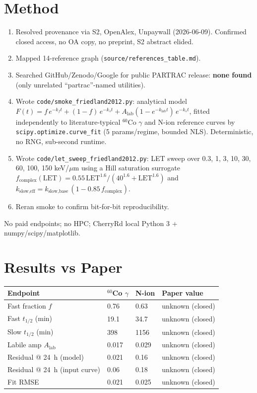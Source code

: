 \documentclass[11pt]{article}
\begin{document}
\section{Method}
\begin{enumerate}
\item Resolved provenance via S2, OpenAlex, Unpaywall (2026-06-09). Confirmed closed access, no OA copy, no preprint, S2 abstract elided.
\item Mapped 14-reference graph (\texttt{source/references\_table.md}).
\item Searched GitHub/Zenodo/Google for public PARTRAC release: \textbf{none found} (only unrelated ``partrac''-named utilities).
\item Wrote \texttt{code/smoke\_friedland2012.py}: analytical model
  $F(t) = f\,e^{-k_f t} + (1{-}f)\,e^{-k_s t} + A_{\text{lab}}(1-e^{-k_{\text{lab}}t})\,e^{-k_s t}$,
  fitted independently to literature-typical $^{60}$Co $\gamma$ and N-ion reference curves by \texttt{scipy.optimize.curve\_fit} (5 params/regime, bounded NLS). Deterministic, no RNG, sub-second runtime.
\item Wrote \texttt{code/let\_sweep\_friedland2012.py}: LET sweep over 0.3, 1, 3, 10, 30, 60, 100, 150 keV/$\mu$m using a Hill saturation surrogate $f_{\text{complex}}(\text{LET}) = 0.55\,\text{LET}^{1.6}/(40^{1.6}+\text{LET}^{1.6})$ and $k_{\text{slow,eff}} = k_{\text{slow,base}}\,(1 - 0.85\,f_{\text{complex}})$.
\item Reran smoke to confirm bit-for-bit reproducibility.
\end{enumerate}

No paid endpoints; no HPC; CherryRd local Python 3 + numpy/scipy/matplotlib.

\section{Results vs Paper}

\begin{tabular}{@{}p{6.5cm}p{2cm}p{2cm}p{3.5cm}@{}}
\toprule
Endpoint & $^{60}$Co $\gamma$ & N-ion & Paper value \\
\midrule
Fast fraction $f$ & 0.76 & 0.63 & unknown (closed) \\
Fast $t_{1/2}$ (min) & 19.1 & 34.7 & unknown (closed) \\
Slow $t_{1/2}$ (min) & 398 & 1156 & unknown (closed) \\
Labile amp $A_{\text{lab}}$ & 0.017 & 0.029 & unknown (closed) \\
Residual @ 24~h (model) & 0.021 & 0.16 & unknown (closed) \\
Residual @ 24~h (input curve) & 0.06 & 0.18 & unknown (closed) \\
Fit RMSE & 0.021 & 0.025 & unknown (closed) \\
\bottomrule
\end{tabular}
\end{document}
